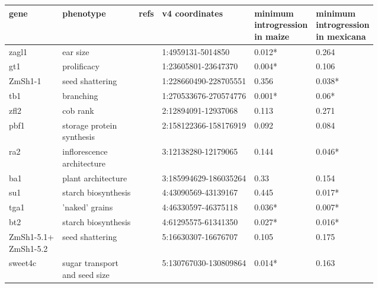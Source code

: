 \begin{sidewaystable}[p]
\centering
\begin{tabular}{llllll}
  \hline
gene & phenotype & refs & v4 coordinates & \makecell[tl]{minimum\\ introgression
\\ in maize} & \makecell[tl]{minimum\\ introgression\\
 in mexicana} \\ 
  \hline
zagl1 & ear size & \cite{Wills:2018_zagl1} & 1:4959131-5014850 & 0.012* & 0.264 \\ 
  gt1 & prolificacy & \cite{Wills:2013_gt1} & 1:23605801-23647370 & 0.004* & 0.106 \\ 
  ZmSh1-1 & seed shattering & \cite{Lin:2012_shattering} & 1:228660490-228705551 & 0.356 & 0.038* \\ 
  tb1 & branching & \cite{Doebley_Stec_Gustus:1995_tb1, Doebley_Stec_Hubbard:1997_tb1, Dong:2019_reg_domestication} & 1:270533676-270574776 & 0.001* & 0.06* \\ 
  zfl2 & cob rank  & \cite{Doebley_Stec:1991, Doebley_Stec:1993, Bomblies_Doebley:2006} & 2:12894091-12937068 & 0.113 & 0.271 \\ 
  pbf1 & \makecell[tl]{storage protein\\ synthesis} & \cite{Wang:1998_pbf} & 2:158122366-158176919 & 0.092 & 0.084 \\ 
  ra2 & \makecell[tl]{inflorescence\\ architecture} & \cite{Vollbrecht:2005_ramosa} & 3:12138280-12179065 & 0.144 & 0.046* \\ 
  ba1 & plant architecture & \cite{Gallavotti:2004_ba1} & 3:185994629-186035264 & 0.33 & 0.154 \\ 
  su1 & starch biosynthesis & \cite{Whitt:2002_starch} & 4:43090569-43139167 & 0.445 & 0.017* \\ 
  tga1 & 'naked' grains & \cite{Dorweiler:1993, Wang:2005_tga1} & 4:46330597-46375118 & 0.036* & 0.007* \\ 
  bt2 & starch biosynthesis & \cite{Whitt:2002_starch} & 4:61295575-61341350 & 0.027* & 0.016* \\ 
  \makecell[tl]{ZmSh1-5.1+\\ZmSh1-5.2} & seed shattering & \cite{Lin:2012_shattering} & 5:16630307-16676707 & 0.105 & 0.175 \\ 
  sweet4c & \makecell[tl]{sugar transport\\ and seed size} & \cite{Sosso:2015} & 5:130767030-130809864 & 0.014* & 0.163 \\ 

\end{tabular}
\end{sidewaystable}
